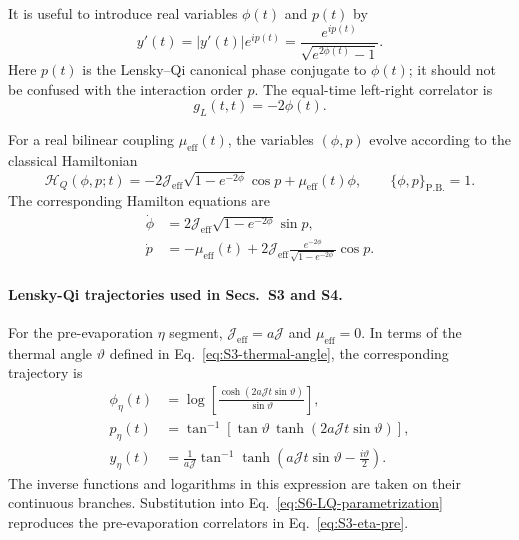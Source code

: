 \documentclass[11pt,a4paper]{article}
\begin{document}
It is useful to introduce real variables \(\phi(t)\) and \(p(t)\) by
\begin{equation}
y'(t)
=
|y'(t)|e^{ip(t)}
=
\frac{
e^{ip(t)}
}{
\sqrt{e^{2\phi(t)}-1}
}.
\label{eq:S6-y-phase-parametrization}
\end{equation}
Here \(p(t)\) is the Lensky--Qi canonical phase conjugate to \(\phi(t)\); it
should not be confused with the interaction order \(p\). The equal-time
left-right correlator is
\begin{equation}
g_L(t,t)=-2\phi(t).
\label{eq:S6-gL-phi}
\end{equation}

For a real bilinear coupling \(\mu_{\mathrm{eff}}(t)\), the variables
\((\phi,p)\) evolve according to the classical Hamiltonian
\begin{equation}
\mathcal H_Q(\phi,p;t)
=
-2\mathcal J_{\mathrm{eff}}
\sqrt{1-e^{-2\phi}}\cos p
+
\mu_{\mathrm{eff}}(t)\phi,
\qquad
\{\phi,p\}_{\mathrm{P.B.}}=1 .
\label{eq:S6-LQ-Hamiltonian}
\end{equation}
The corresponding Hamilton equations are
\begin{equation}
\begin{aligned}
\dot\phi
&=
2\mathcal J_{\mathrm{eff}}
\sqrt{1-e^{-2\phi}}\sin p,
\\
\dot p
&=
-\mu_{\mathrm{eff}}(t)
+
2\mathcal J_{\mathrm{eff}}
\frac{
e^{-2\phi}
}{
\sqrt{1-e^{-2\phi}}
}
\cos p .
\end{aligned}
\label{eq:S6-LQ-Hamilton-equations}
\end{equation}

\paragraph*{Lensky-Qi trajectories used in Secs.~S3 and S4.}

For the pre-evaporation \(\eta\) segment,
\(\mathcal J_{\mathrm{eff}}=a\mathcal J\) and
\(\mu_{\mathrm{eff}}=0\). In terms of the thermal angle \(\vartheta\) defined
in Eq.~\eqref{eq:S3-thermal-angle}, the corresponding trajectory is
\begin{equation}
\begin{aligned}
\phi_\eta(t)
&=
\log\left[
\frac{
\cosh\left(
2a\mathcal Jt\sin\vartheta
\right)
}{
\sin\vartheta
}
\right],
\\
p_\eta(t)
&=
\tan^{-1}\left[
\tan\vartheta\,
\tanh\left(
2a\mathcal Jt\sin\vartheta
\right)
\right],
\\
y_\eta(t)
&=
\frac{1}{a\mathcal J}
\tan^{-1}
\tanh\left(
a\mathcal Jt\sin\vartheta
-\frac{i\vartheta}{2}
\right).
\end{aligned}
\label{eq:S6-eta-trajectory}
\end{equation}
The inverse functions and logarithms in this expression are taken on their
continuous branches. Substitution into
Eq.~\eqref{eq:S6-LQ-parametrization} reproduces the pre-evaporation
correlators in Eq.~\eqref{eq:S3-eta-pre}.
\end{document}
